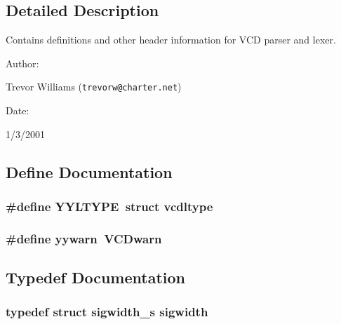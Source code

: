 \subsection{Detailed Description}
Contains definitions and other header information for VCD parser and lexer.



\begin{Desc}
\item[Author: ]\par
Trevor Williams ({\tt trevorw@charter.net}) \end{Desc}
\begin{Desc}
\item[Date: ]\par
1/3/2001\end{Desc}


\subsection{Define Documentation}
\subsubsection{\setlength{\rightskip}{0pt plus 5cm}\#define YYLTYPE\ struct {\bf vcdltype}}\label{vcd__parser__misc_8h_a0}


\subsubsection{\setlength{\rightskip}{0pt plus 5cm}\#define yywarn\ VCDwarn}\label{vcd__parser__misc_8h_a1}




\subsection{Typedef Documentation}
\subsubsection{\setlength{\rightskip}{0pt plus 5cm}typedef struct {\bf sigwidth\_\-s} sigwidth}\label{vcd__parser__misc_8h_a2}


